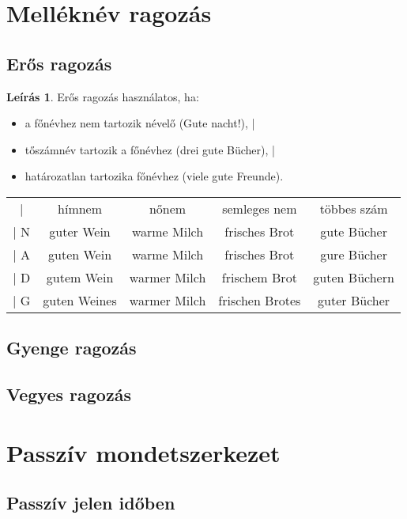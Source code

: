 \documentclass{article}
\theoremstyle{definition}
\newtheorem*{desc}{Leírás}
\begin{document}
\section{Melléknév ragozás}

\subsection{Erős ragozás}

\begin{desc}
Erős ragozás használatos, ha:

\begin{itemize}
 | \item a főnévhez nem tartozik névelő (Gute nacht!),
 | \item tőszámnév tartozik a főnévhez (drei gute Bücher),
 | \item határozatlan tartozika főnévhez (viele gute Freunde).
\end{itemize}

\begin{tabular}{ccccc}
 |  & hímnem & nőnem & semleges nem & többes szám\\
 | N & guter Wein & warme Milch & frisches Brot & gute Bücher\\
 | A & guten Wein & warme Milch & frisches Brot & gure Bücher\\
 | D & gutem Wein & warmer Milch & frischem Brot & guten Büchern\\
 | G & guten Weines & warmer Milch & frischen Brotes & guter Bücher\\
\end{tabular}
\end{desc}

\subsection{Gyenge ragozás}

\subsection{Vegyes ragozás}

\section{Passzív mondetszerkezet}

\subsection{Passzív jelen időben}
\end{document}
